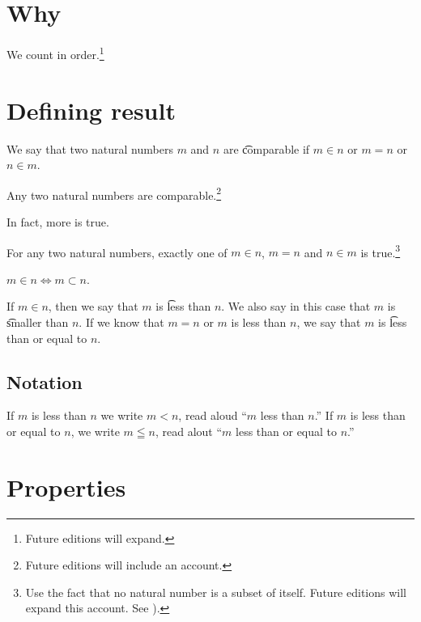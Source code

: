 

\section*{Why}

We count in order.\footnote{Future editions will expand.}

\section*{Defining result}

We say that two natural numbers $m$ and $n$ are \t{comparable} if $m \in n$ or $m = n$ or $n \in m$.

\begin{proposition}
Any two natural numbers are comparable.\footnote{Future editions will include an account.}
\end{proposition}

In fact, more is true.

\begin{proposition}
For any two natural numbers, exactly one of $m \in n$, $m = n$ and $n \in m$ is true.\footnote{Use the fact that no natural number is a subset of itself. Future editions will expand this account. See ).}
\end{proposition}

\begin{proposition}
$m \in n \iff m \subset n$.
\end{proposition}

If $m \in n$, then we say that $m$ is \t{less than} $n$.
We also say in this case that $m$ is \t{smaller than} $n$.
If we know that $m = n$ or $m$ is less than $n$, we say that $m$ is \t{less than or equal to} $n$.

\subsection*{Notation}

If $m$ is less than $n$ we write $m < n$, read aloud ``$m$ less than $n$.''
If $m$ is less than or equal to $n$, we write $m \leqq n$, read alout ``$m$ less than or equal to $n$.''

\section*{Properties}

